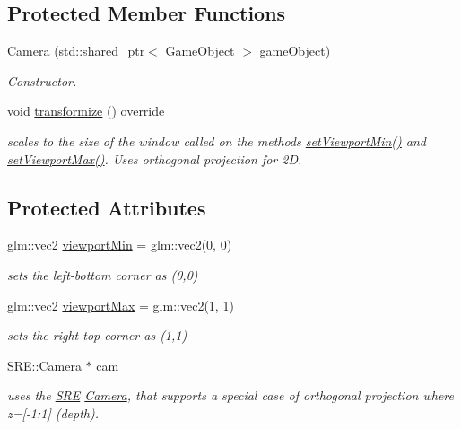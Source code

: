 \subsection*{Protected Member Functions}
\begin{DoxyCompactItemize}
\item 
\hyperlink{class_mason_1_1_camera_af0b5abfa91d40f8338b84744e99aea66}{Camera} (std\+::shared\+\_\+ptr$<$ \hyperlink{class_mason_1_1_game_object}{Game\+Object} $>$ \hyperlink{class_mason_1_1_component_abaa67b569d0a70e26a4606f4a099a925}{game\+Object})
\begin{DoxyCompactList}\small\item\em Constructor. \end{DoxyCompactList}\item 
void \hyperlink{class_mason_1_1_camera_a27ff2d3ad004a49db2ae508ac6e9d3c2}{transformize} () override
\begin{DoxyCompactList}\small\item\em scales to the size of the window called on the methods \hyperlink{class_mason_1_1_camera_aa630259d7e0c0124dec5c9aaf33b7160}{set\+Viewport\+Min()} and \hyperlink{class_mason_1_1_camera_a1f9a7896bb617d1402e3c4738324e1ea}{set\+Viewport\+Max()}. Uses orthogonal projection for 2D. \end{DoxyCompactList}\end{DoxyCompactItemize}
\subsection*{Protected Attributes}
\begin{DoxyCompactItemize}
\item 
glm\+::vec2 \hyperlink{class_mason_1_1_camera_a87d7d4111e63ecb41bac7ea33ef270e1}{viewport\+Min} = glm\+::vec2(0, 0)
\begin{DoxyCompactList}\small\item\em sets the left-\/bottom corner as (0,0) \end{DoxyCompactList}\item 
glm\+::vec2 \hyperlink{class_mason_1_1_camera_a8c7510e4c83e123aebbe7bb36da80de9}{viewport\+Max} = glm\+::vec2(1, 1)
\begin{DoxyCompactList}\small\item\em sets the right-\/top corner as (1,1) \end{DoxyCompactList}\item 
S\+R\+E\+::\+Camera $\ast$ \hyperlink{class_mason_1_1_camera_a74f870fa866086c21f28f0a1f59254cc}{cam}
\begin{DoxyCompactList}\small\item\em uses the \hyperlink{namespace_s_r_e}{S\+RE} \hyperlink{class_mason_1_1_camera}{Camera}, that supports a special case of orthogonal projection where z=\mbox{[}-\/1\+:1\mbox{]} (depth). \end{DoxyCompactList}\end{DoxyCompactItemize}
